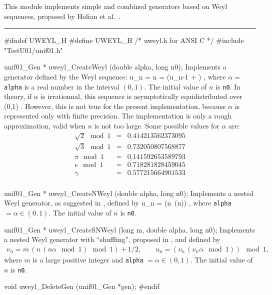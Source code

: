 
This module implements simple and combined generators based on 
Weyl sequences, proposed by Holian et al.\ \cite{rHOL94a}.


\bigskip
\hrule
\code
\hide
#ifndef UWEYL_H
#define UWEYL_H
/* uweyl.h for ANSI C */
\endhide
#include "TestU01/unif01.h"


unif01_Gen * uweyl_CreateWeyl (double alpha, long n0);
\endcode
 \tab  Implements a  generator defined by the 
 Weyl sequence:
 \eq
   u_n = n \alpha {} = (u_{n-1} + \alpha) ,
 \endeq
 where $\alpha = $ {\tt alpha} is a  real number in the interval $(0,1)$.
 The  initial value of $n$ is {\tt n0}.
 In theory, if $\alpha$ is irrationnal, this sequence is asymptotically
 equidistributed over (0,1) \cite {rWEY16a}.
 However, this is not true for the present 
 implementation, because 
 $\alpha$ is represented only with finite precision.
 The implementation is only a rough approximation,
 valid when $n$ is not too large.
 Some possible values for $\alpha$ are:
 \begin {eqnarray*}
   \sqrt{2} \mod 1 &=&  0.414213562373095 \\
   \sqrt{3} \mod 1 &=&  0.732050807568877 \\
   \pi      \mod 1 &=&  0.141592653589793 \\
   e        \mod 1 &=&  0.718281828459045 \\
   \gamma          &=&  0.577215664901533 \\
 \end {eqnarray*}
 \endtab
\code

unif01_Gen * uweyl_CreateNWeyl (double alpha, long n0);
\endcode
 \tab  Implements a nested Weyl generator, as suggested in \cite{rHOL94a}, 
 defined by
 \eq
   u_n = (n\, (n\alpha {})) ,
 \endeq
 where {\tt alpha} $= \alpha \in (0,1)$. 
  The initial value of $n$ is {\tt n0}.
 \endtab
\code


unif01_Gen * uweyl_CreateSNWeyl (long m, double alpha, long n0);
\endcode
 \tab  Implements a nested Weyl generator with
 ``shuffling'', proposed in \cite{rHOL94a}, and defined by
 \begin {eqnarray*}
   \nu_n = m\, (n\, (n \alpha \mod 1) \mod 1) + 1/2,
       \qquad u_n   = (\nu_n\, (\nu_n \alpha \mod 1)) \mod 1,
 \end {eqnarray*}
 where $m$ is a large positive integer and  {\tt alpha} $=\alpha \in (0,1)$.
 The initial value of $n$ is {\tt n0}.
 \endtab



\code

void uweyl_DeleteGen (unif01_Gen *gen);
\endcode
 \tab \DelGen
 \endtab
\code
\hide
#endif
\endhide
\endcode
